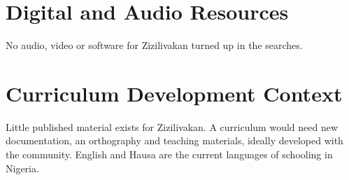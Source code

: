 \documentclass[12pt]{article}
\begin{document}
\section{Digital and Audio Resources}
No audio, video or software for Zizilivakan turned up in the searches.

\section{Curriculum Development Context}
Little published material exists for Zizilivakan. A curriculum would need new documentation, an orthography and teaching materials, ideally developed with the community. English and Hausa are the current languages of schooling in Nigeria.
\end{document}
